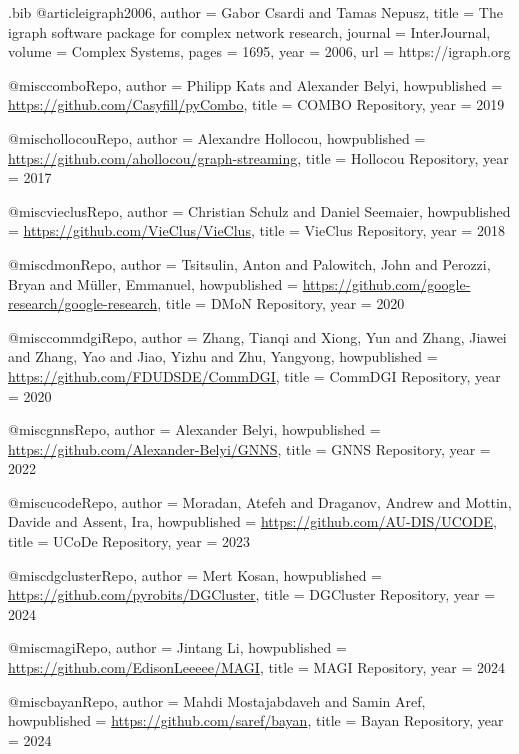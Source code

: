 \documentclass[11pt,a4paper]{article}
\begin{document}
\begin{filecontents*}[overwrite]{\jobname.bib}
@article{igraph2006,
  author  = {Gabor Csardi and Tamas Nepusz},
  title   = {The igraph software package for complex network research},
  journal = {InterJournal},
  volume  = {Complex Systems},
  pages   = {1695},
  year    = {2006},
  url     = {https://igraph.org}
}

@misc{comboRepo,
  author       = {Philipp Kats and Alexander Belyi},
  howpublished = {\url{https://github.com/Casyfill/pyCombo}},
  title        = {{COMBO} Repository},
  year         = {2019}
}

@misc{hollocouRepo,
  author       = {Alexandre Hollocou},
  howpublished = {\url{https://github.com/ahollocou/graph-streaming}},
  title        = {{Hollocou} Repository},
  year         = {2017}
}

@misc{vieclusRepo,
  author       = {Christian Schulz and Daniel Seemaier},
  howpublished = {\url{https://github.com/VieClus/VieClus}},
  title        = {{VieClus} Repository},
  year         = {2018}
}

@misc{dmonRepo,
  author       = {Tsitsulin, Anton and Palowitch, John and Perozzi, Bryan and M{\"u}ller, Emmanuel},
  howpublished = {\url{https://github.com/google-research/google-research}},
  title        = {{DMoN} Repository},
  year         = {2020}
}

@misc{commdgiRepo,
  author       = {Zhang, Tianqi and Xiong, Yun and Zhang, Jiawei and Zhang, Yao and Jiao, Yizhu and Zhu, Yangyong},
  howpublished = {\url{https://github.com/FDUDSDE/CommDGI}},
  title        = {{CommDGI} Repository},
  year         = {2020}
}

@misc{gnnsRepo,
  author       = {Alexander Belyi},
  howpublished = {\url{https://github.com/Alexander-Belyi/GNNS}},
  title        = {{GNNS} Repository},
  year         = {2022}
}

@misc{ucodeRepo,
  author       = {Moradan, Atefeh and Draganov, Andrew and Mottin, Davide and Assent, Ira},
  howpublished = {\url{https://github.com/AU-DIS/UCODE}},
  title        = {{UCoDe} Repository},
  year         = {2023}
}

@misc{dgclusterRepo,
  author       = {Mert Kosan},
  howpublished = {\url{https://github.com/pyrobits/DGCluster}},
  title        = {{DGCluster} Repository},
  year         = {2024}
}

@misc{magiRepo,
  author       = {Jintang Li},
  howpublished = {\url{https://github.com/EdisonLeeeee/MAGI}},
  title        = {{MAGI} Repository},
  year         = {2024}
}

@misc{bayanRepo,
  author       = {Mahdi Mostajabdaveh and Samin Aref},
  howpublished = {\url{https://github.com/saref/bayan}},
  title        = {{Bayan} Repository},
  year         = {2024}
}


\end{filecontents*}
\end{document}
